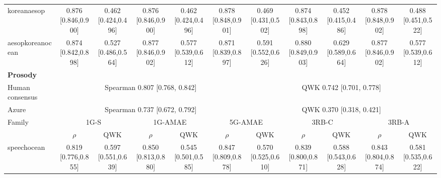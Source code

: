 \documentclass[10pt]{article}
\begin{document}
\begin{landscape}
\begin{longtable}{@{}l*{10}{c}@{}}
koreanaesop & \shortstack{0.876\\{}[0.846,0.900]} & \shortstack{0.462\\{}[0.424,0.496]} & \shortstack{0.876\\{}[0.846,0.900]} & \shortstack{0.462\\{}[0.424,0.496]} & \shortstack{0.878\\{}[0.848,0.901]} & \shortstack{0.469\\{}[0.431,0.502]} & \shortstack{0.874\\{}[0.843,0.898]} & \shortstack{0.452\\{}[0.415,0.486]} & \shortstack{0.878\\{}[0.848,0.902]} & \shortstack{0.488\\{}[0.451,0.522]}\\
aesopkoreanocean & \shortstack{0.874\\{}[0.842,0.898]} & \shortstack{0.527\\{}[0.486,0.564]} & \shortstack{0.877\\{}[0.846,0.902]} & \shortstack{0.577\\{}[0.539,0.612]} & \shortstack{0.871\\{}[0.839,0.897]} & \shortstack{0.591\\{}[0.552,0.626]} & \shortstack{0.880\\{}[0.849,0.903]} & \shortstack{0.629\\{}[0.589,0.664]} & \shortstack{0.877\\{}[0.846,0.902]} & \shortstack{0.577\\{}[0.539,0.612]}\\
\midrule
\multicolumn{11}{l}{\textbf{Prosody}}\\*
\toprule
Human consensus & \multicolumn{5}{c}{Spearman 0.807 [0.768, 0.842]} & \multicolumn{5}{c}{QWK 0.742 [0.701, 0.778]}\\
Azure & \multicolumn{5}{c}{Spearman 0.737 [0.672, 0.792]} & \multicolumn{5}{c}{QWK 0.370 [0.318, 0.421]}\\
\midrule
Family & \multicolumn{2}{c}{1G-S} & \multicolumn{2}{c}{1G-AMAE} & \multicolumn{2}{c}{5G-AMAE} & \multicolumn{2}{c}{3RB-C} & \multicolumn{2}{c}{3RB-A}\\
 & $\rho$ & QWK & $\rho$ & QWK & $\rho$ & QWK & $\rho$ & QWK & $\rho$ & QWK\\
\midrule
speechocean & \shortstack{0.819\\{}[0.776,0.855]} & \shortstack{0.597\\{}[0.551,0.639]} & \shortstack{0.850\\{}[0.813,0.880]} & \shortstack{0.545\\{}[0.501,0.585]} & \shortstack{0.847\\{}[0.809,0.878]} & \shortstack{0.570\\{}[0.525,0.610]} & \shortstack{0.839\\{}[0.800,0.871]} & \shortstack{0.588\\{}[0.543,0.628]} & \shortstack{0.843\\{}[0.804,0.874]} & \shortstack{0.581\\{}[0.535,0.622]}\\

\end{longtable}
\end{landscape}
\end{document}
